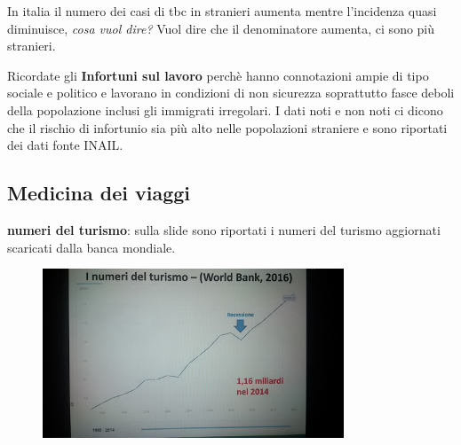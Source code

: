 In italia il numero dei casi di tbc in stranieri aumenta mentre
l'incidenza quasi diminuisce, \emph{cosa vuol dire?} Vuol dire che il
denominatore aumenta, ci sono più stranieri.

Ricordate gli \textbf{Infortuni sul lavoro} perchè hanno connotazioni
ampie di tipo sociale e politico e lavorano in condizioni di non
sicurezza soprattutto fasce deboli della popolazione inclusi gli
immigrati irregolari. I dati noti e non noti ci dicono che il rischio di
infortunio sia più alto nelle popolazioni straniere e sono riportati dei
dati fonte INAIL.

\subsection{Medicina dei viaggi}

\textbf{numeri del turismo}: sulla slide sono riportati i numeri del
turismo aggiornati scaricati dalla banca mondiale.

\begin{figure}[!ht]
\centering
	\includegraphics[width=0.8\textwidth]{27/image5.jpeg}
	\end{figure}
	
